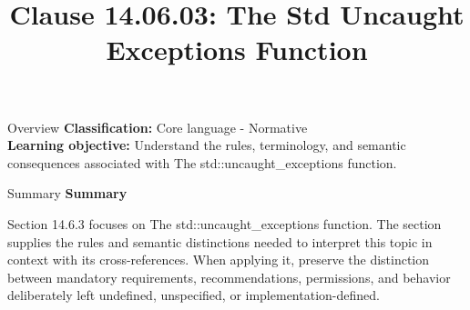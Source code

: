 \documentclass[10pt,letterpaper]{article}
\title{Clause 14.06.03: The Std Uncaught Exceptions Function}
\author{}
\date{}
\begin{document}
\maketitle
\begin{CornellOverviewBox}{Overview}
\textbf{Classification:} Core language - Normative\\[2pt]
\textbf{Learning objective:} Understand the rules, terminology, and semantic consequences associated with The std::uncaught\_exceptions function.
\end{CornellOverviewBox}\begin{CornellSummaryBox}{Summary}
{\sffamily\bfseries\color{Accent} Summary}\par\vspace{3pt}Section 14.6.3 focuses on The std::uncaught\_exceptions function. The section supplies the rules and semantic distinctions needed to interpret this topic in context with its cross-references. When applying it, preserve the distinction between mandatory requirements, recommendations, permissions, and behavior deliberately left undefined, unspecified, or implementation-defined.
\end{CornellSummaryBox}
\end{document}
